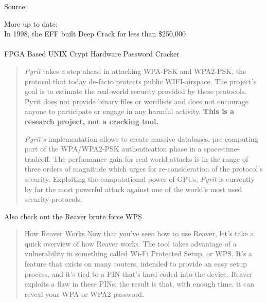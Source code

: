 \documentclass[20pt,landscape,a4paper,footrule]{foils}
\begin{document}


Source: 

More up to date:\\
In 1998, the EFF built Deep Crack for less than \$250,000\\
\\
FPGA Based UNIX Crypt Hardware Password Cracker\\


\begin{quote}
\emph{Pyrit} takes a step ahead in attacking WPA-PSK and WPA2-PSK, the protocol that today de-facto protects public WIFI-airspace. The project's goal is to estimate the real-world security provided by these protocols. Pyrit does not provide binary files or wordlists and does not encourage anyone to participate or engage in any harmful activity. {\bf This is a research project, not a cracking tool.}

\emph{Pyrit's} implementation allows to create massive databases, pre-computing part of the WPA/WPA2-PSK authentication phase in a space-time-tradeoff. The performance gain for real-world-attacks is in the range of three orders of magnitude which urges for re-consideration of the protocol's security. Exploiting the computational power of GPUs, \emph{Pyrit} is currently by far the most powerful attack against one of the world's most used security-protocols.
\end{quote}

\begin{list1}
\item {}
\item Also check out the Reaver brute force WPS\\ 
\end{list1}


\begin{quote}
How Reaver Works
Now that you've seen how to use Reaver, let's take a quick overview of how Reaver works. The tool takes advantage of a vulnerability in something called Wi-Fi Protected Setup, or WPS. It's a feature that exists on many routers, intended to provide an easy setup process, and it's tied to a PIN that's hard-coded into the device. Reaver exploits a flaw in these PINs; the result is that, with enough time, it can reveal your WPA or WPA2 password.
\end{quote}
\end{document}
